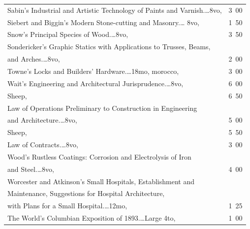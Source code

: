 \documentclass[a4paper,12pt]{book}[2004/02/16]
\theoremstyle{ilemma}
\theoremstyle{itheorem}
\theoremstyle{iother}
\theoremstyle{icorollary}
\theoremstyle{numcorollary}
\theoremstyle{idefinition}
\begin{document}
\begin{longtable}{@{}l@{ }r@{}}
Sabin's Industrial and Artistic Technology of Paints and
Varnish.\dotfill\ldots 8vo, &3\ 00\\

Siebert and Biggin's Modern Stone-cutting and Masonry.\dotfill\ldots
8vo, &1\ 50\\

Snow's Principal Species of Wood.\dotfill\ldots 8vo, &3\ 50\\

Sondericker's Graphic Statics with Applications to Trusses, Beams,\\

\nopagebreak
\indent\indent and Arches.\dotfill\ldots 8vo, &2\ 00\\

Towne's Locks and Builders' Hardware.\dotfill\ldots 18mo, morocco, &3\ 00\\

Wait's Engineering and Architectural Jurisprudence.\dotfill\ldots 8vo,
&6\ 00\\

\nopagebreak
\hfill Sheep, &6\ 50\\

\indent Law of Operations Preliminary to Construction in Engineering\\

\indent\indent and Architecture.\dotfill\ldots 8vo, &5\ 00\\

\nopagebreak
\hfill Sheep, &5\ 50\\

\indent Law of Contracts.\dotfill\ldots 8vo, &3\ 00\\

Wood's Rustless Coatings: Corrosion and Electrolysis of Iron\\

\nopagebreak
\indent\indent and Steel.\dotfill\ldots 8vo, &4\ 00\\

Worcester and Atkinson's Small Hospitals, Establishment and\\

\nopagebreak
\indent\indent Maintenance, Suggestions for Hospital Architecture,\\

\nopagebreak
\indent\indent with Plans for a Small Hospital.\dotfill\ldots 12mo, &1\ 25\\

The World's Columbian Exposition of 1893.\dotfill\ldots Large 4to, &1\
00\\[3em]


\end{longtable}
\end{document}
